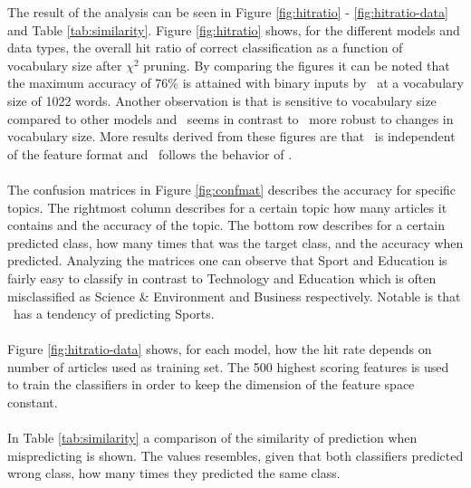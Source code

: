 \label{sec:result}
The result of the analysis can be seen in Figure \ref{fig:hitratio} - \ref{fig:hitratio-data} and Table \ref{tab:similarity}. Figure \ref{fig:hitratio} shows, for the different models and data types, the overall hit ratio of correct classification as a function of vocabulary size after $\chi^2$ pruning. By comparing the figures it can be noted that the maximum accuracy of 76\% is attained with binary inputs by \mn\ at a vocabulary size of 1022 words. Another observation is that \bn is sensitive to vocabulary size compared to other models and \svm\  seems in contrast to \bn\ more robust to changes in vocabulary size. More results derived from these figures are that \rf\ is independent of the feature format and \hy\ follows the behavior of \mn.
\\\\
The confusion matrices in Figure \ref{fig:confmat} describes the accuracy for specific topics. The rightmost column describes for a certain topic how many articles it contains and the accuracy of the topic. The bottom row describes for a certain predicted class, how many times that was the target class, and the accuracy when predicted. Analyzing the matrices one can observe that Sport and Education is fairly easy to classify in contrast to Technology and Education which is often misclassified as Science \& Environment and Business respectively. Notable is that \rf\ has a tendency of predicting Sports.
\\\\
Figure \ref{fig:hitratio-data} shows, for each model, how the hit rate depends on number of articles used as training set. The 500 highest scoring features is used to train the classifiers in order to keep the dimension of the feature space constant.
\\\\
In Table \ref{tab:similarity} a comparison of the similarity of prediction when mispredicting is shown. The values resembles, given that both classifiers predicted wrong class, how many times they predicted the same class.

\onecolumn

\onecolumn

\onecolumn

\twocolumn
